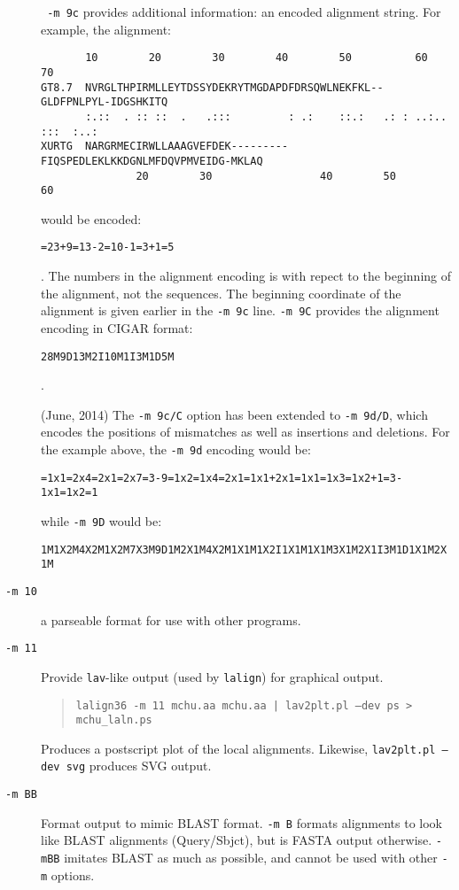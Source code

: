 \documentclass[11pt]{article}
\begin{document}
\begin{description}
\texttt{ -m 9c} provides additional information: an encoded alignment string.  For example, the alignment:
\begin{footnotesize}
\begin{verbatim}
       10        20        30        40        50          60         70  
GT8.7  NVRGLTHPIRMLLEYTDSSYDEKRYTMGDAPDFDRSQWLNEKFKL--GLDFPNLPYL-IDGSHKITQ
       :.::  . :: ::  .   .:::         : .:    ::.:   .: : ..:.. :::  :..:
XURTG  NARGRMECIRWLLAAAGVEFDEK---------FIQSPEDLEKLKKDGNLMFDQVPMVEIDG-MKLAQ
               20        30                 40        50        60        
\end{verbatim}
\end{footnotesize}
would be encoded:
\begin{footnotesize}
\texttt{=23+9=13-2=10-1=3+1=5}
\end{footnotesize}.
The numbers in the alignment encoding is with repect to the beginning
of the alignment, not the sequences.  The beginning coordinate of the
alignment is given earlier in the \texttt{-m 9c} line.  \texttt{-m 9C}
provides the alignment encoding in CIGAR format:
\begin{footnotesize}
\texttt{28M9D13M2I10M1I3M1D5M}
\end{footnotesize}.

(June, 2014) The \texttt{-m 9c/C} option has been extended to
\texttt{-m 9d/D}, which encodes the positions of mismatches as well as
insertions and deletions.  For the example above, the \texttt{-m 9d}
encoding would be:
\begin{footnotesize}
\texttt{=1x1=2x4=2x1=2x7=3-9=1x2=1x4=2x1=1x1+2x1=1x1=1x3=1x2+1=3-1x1=1x2=1}
\end{footnotesize}
while \texttt{-m 9D} would be:
\begin{footnotesize}
\texttt{1M1X2M4X2M1X2M7X3M9D1M2X1M4X2M1X1M1X2I1X1M1X1M3X1M2X1I3M1D1X1M2X1M}
\end{footnotesize}
\item[\texttt{-m 10}]
a parseable format for use with other programs.
\item[\texttt{-m 11}]
Provide \texttt{lav}-like output (used by \texttt{lalign}) for graphical output.
\begin{quote}
\texttt{lalign36 -m 11 mchu.aa mchu.aa | lav2plt.pl --dev ps  > mchu\_laln.ps}
\end{quote}
Produces a postscript plot of the local alignments.  Likewise,
\texttt{lav2plt.pl --dev svg} produces SVG output.

\item[\texttt{-m BB}] Format output to mimic BLAST format.  \texttt{-m
  B} formats alignments to look like BLAST alignments (Query/Sbjct),
  but is FASTA output otherwise. \texttt{-mBB} imitates BLAST as much
  as possible, and cannot be used with other \texttt{-m} options.


\end{description}
\end{document}
